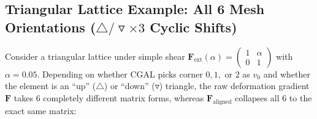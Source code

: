 \documentclass[11pt,a4paper]{article}
\begin{document}
\subsection{Triangular Lattice Example: All 6 Mesh Orientations ($\triangle / \triangledown \times 3$ Cyclic Shifts)}
Consider a triangular lattice under simple shear $\mathbf{F}_{\text{ext}}(\alpha) = \begin{pmatrix} 1 & \alpha \\ 0 & 1 \end{pmatrix}$ with $\alpha = 0.05$. Depending on whether CGAL picks corner $0, 1,$ or $2$ as $v_0$ and whether the element is an ``up'' ($\triangle$) or ``down'' ($\triangledown$) triangle, the raw deformation gradient $\mathbf{F}$ takes 6 completely different matrix forms, whereas $\mathbf{F}_{\text{aligned}}$ collapses all 6 to the exact same matrix:
\end{document}
